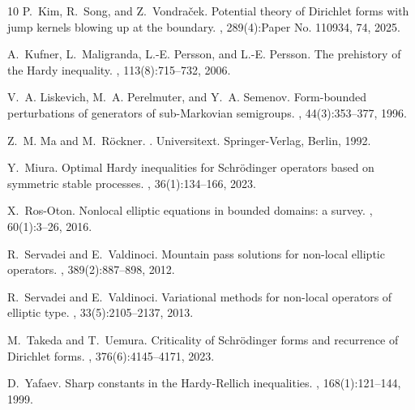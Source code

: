 \documentclass[12pt, a4paper]{amsart}
\begin{document}
\begin{thebibliography}{10}
P.~Kim, R.~Song, and Z.~Vondra\v{c}ek.
\newblock Potential theory of {D}irichlet forms with jump kernels blowing up at the boundary.
, 289(4):Paper No. 110934, 74, 2025.

A.~Kufner, L.~Maligranda, L.-E. Persson, and L.-E. Persson.
\newblock The prehistory of the {H}ardy inequality.
, 113(8):715--732, 2006.

V.~A. Liskevich, M.~A. Perelmuter, and Y.~A. Semenov.
\newblock Form-bounded perturbations of generators of sub-{M}arkovian semigroups.
, 44(3):353--377, 1996.

Z.~M. Ma and M.~R\"{o}ckner.
.
\newblock Universitext. Springer-Verlag, Berlin, 1992.

Y.~Miura.
\newblock Optimal {H}ardy inequalities for {S}chr\"{o}dinger operators based on symmetric stable processes.
, 36(1):134--166, 2023.

X.~Ros-Oton.
\newblock Nonlocal elliptic equations in bounded domains: a survey.
, 60(1):3--26, 2016.

R.~Servadei and E.~Valdinoci.
\newblock Mountain pass solutions for non-local elliptic operators.
, 389(2):887--898, 2012.

R.~Servadei and E.~Valdinoci.
\newblock Variational methods for non-local operators of elliptic type.
, 33(5):2105--2137, 2013.

M.~Takeda and T.~Uemura.
\newblock Criticality of {S}chr\"{o}dinger forms and recurrence of {D}irichlet forms.
, 376(6):4145--4171, 2023.

D.~Yafaev.
\newblock Sharp constants in the {H}ardy-{R}ellich inequalities.
, 168(1):121--144, 1999.

\end{thebibliography}
\end{document}
